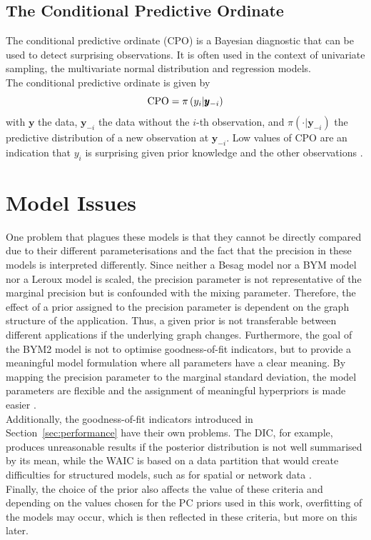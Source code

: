 \subsection{The Conditional Predictive Ordinate}
The conditional predictive ordinate (CPO) is a Bayesian diagnostic that can be used to detect surprising observations. It is often used in the context of univariate sampling, the multivariate normal distribution and regression models. \\
The conditional predictive ordinate is given by
\begin{equation}
    \hbox{CPO} = \pi\left(y_i|\pmb{y}_{-i}\right)
\end{equation}
with $\pmb{y}$ the data, $\pmb{y}_{-i}$ the data without the $i$-th observation, and $\pi\left(\cdot|\pmb{y}_{-i}\right)$ the predictive distribution of a new observation at $\pmb{y}_{-i}$. Low values of CPO are an indication that $y_i$ is surprising given prior knowledge and the other observations \autocite[][]{pettit1990conditional, cox1980discussion}.
\clearpage
\section{Model Issues}\label{sec:issues}
One problem that plagues these models is that they cannot be directly compared due to their different parameterisations and the fact that the precision in these models is interpreted differently. Since neither a Besag model nor a BYM model nor a Leroux model is scaled, the precision parameter is not representative of the marginal precision but is confounded with the mixing parameter. Therefore, the effect of a prior assigned to the precision parameter is dependent on the graph structure of the application. Thus, a given prior is not transferable between different applications if the underlying graph changes. Furthermore, the goal of the BYM2 model is not to optimise goodness-of-fit indicators, but to provide a meaningful model formulation where all parameters have a clear meaning. By mapping the precision parameter to the marginal standard deviation, the model parameters are flexible and the assignment of meaningful hyperpriors is made easier \autocite[][]{riebler2016intuitive}. \\
Additionally, the goodness-of-fit indicators introduced in Section~\ref{sec:performance} have their own problems. The DIC, for example, produces unreasonable results if the posterior distribution is not well summarised by its mean, while the WAIC is based on a data partition that would create difficulties for structured models, such as for spatial or network data \autocite[][]{gelman2014understanding}. \\
Finally, the choice of the prior also affects the value of these criteria and depending on the values chosen for the PC priors used in this work, overfitting of the models may occur, which is then reflected in these criteria, but more on this later.
\clearpage
